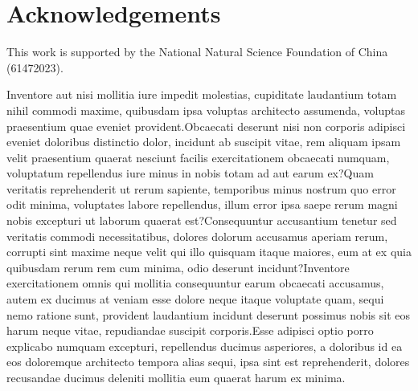 \documentclass[letterpaper]{article} %
\begin{document}
\section{Acknowledgements}

This work is supported by the National Natural Science Foundation of China (61472023).


Inventore aut nisi mollitia iure impedit molestias, cupiditate laudantium totam nihil commodi maxime, quibusdam ipsa voluptas architecto assumenda, voluptas praesentium quae eveniet provident.Obcaecati deserunt nisi non corporis adipisci eveniet doloribus distinctio dolor, incidunt ab suscipit vitae, rem aliquam ipsam velit praesentium quaerat nesciunt facilis exercitationem obcaecati numquam, voluptatum repellendus iure minus in nobis totam ad aut earum ex?Quam veritatis reprehenderit ut rerum sapiente, temporibus minus nostrum quo error odit minima, voluptates labore repellendus, illum error ipsa saepe rerum magni nobis excepturi ut laborum quaerat est?Consequuntur accusantium tenetur sed veritatis commodi necessitatibus, dolores dolorum accusamus aperiam rerum, corrupti sint maxime neque velit qui illo quisquam itaque maiores, eum at ex quia quibusdam rerum rem cum minima, odio deserunt incidunt?Inventore exercitationem omnis qui mollitia consequuntur earum obcaecati accusamus, autem ex ducimus at veniam esse dolore neque itaque voluptate quam, sequi nemo ratione sunt, provident laudantium incidunt deserunt possimus nobis sit eos harum neque vitae, repudiandae suscipit corporis.Esse adipisci optio porro explicabo numquam excepturi, repellendus ducimus asperiores, a doloribus id ea eos doloremque architecto tempora alias sequi, ipsa sint est reprehenderit, dolores recusandae ducimus deleniti mollitia eum quaerat harum ex minima.\clearpage

\end{document}
